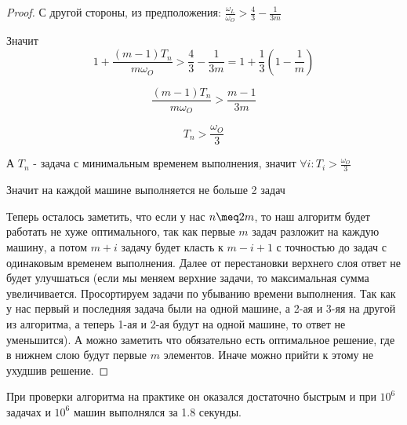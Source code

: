 \documentclass{article}
\begin{document}
\begin{proof}
С другой стороны, из предположения: $\frac{\omega_L}{\omega_O} > \frac{4}{3} - \frac{1}{3m}$

Значит $$1 + \frac{(m - 1)T_n}{m\omega_O} > \frac{4}{3} - \frac{1}{3m} = 1 + \frac{1}{3}(1 - \frac{1}{m})$$

$$\frac{(m - 1)T_n}{m\omega_O} > \frac{m - 1}{3m}$$

$$T_n > \frac{\omega_O}{3}$$

А $T_n$ - задача с минимальным временем выполнения, значит $\forall{i} : T_i > \frac{\omega_O}{3}$

Значит на каждой машине выполняется не больше 2 задач

Теперь осталось заметить, что если у нас $n \meq 2m$, то наш алгоритм будет работать не хуже оптимального, так как первые $m$ задач разложит на каждую машину, а потом $m + i$ задачу будет класть к $m - i + 1$ с точностью до задач с одинаковым временем выполнения. Далее от перестановки верхнего слоя ответ не будет улучшаться (если мы меняем верхние задачи, то максимальная сумма увеличивается. Просортируем задачи по убыванию времени выполнения. Так как у нас первый и последняя задача были на одной машине, а 2-ая и 3-яя на другой из алгоритма, а теперь 1-ая и 2-ая будут на одной машине, то ответ не уменьшится). А можно заметить что обязательно есть оптимальное решение, где в нижнем слою будут первые $m$ элементов. Иначе можно прийти к этому не ухудшив решение.

\end{proof}

При проверки алгоритма на практике он оказался достаточно быстрым и при $10^6$ задачах и $10^6$ машин выполнялся за 1.8 секунды.

\renewcommand{\refname}{Библиография}


\end{document}
